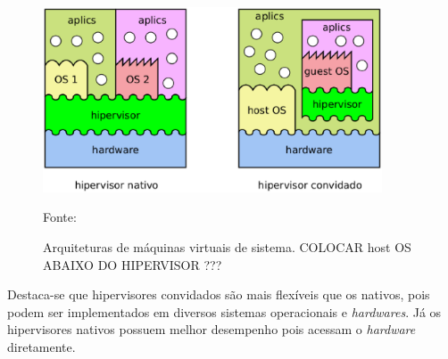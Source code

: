 \begin{figure}[vms_arquiteturas]
 \centering
 \includegraphics[width=380px]{img/vms_arquiteturas.eps}
 \caption{Arquiteturas de máquinas virtuais de sistema. COLOCAR host OS ABAIXO DO HIPERVISOR ???}
 \label{fig:vms_arquiteturas}
 Fonte: \citet{maziero2013}
\end{figure}

Destaca-se que hipervisores convidados são mais flexíveis que os nativos, pois podem ser implementados em diversos sistemas operacionais 
e \textit{hardwares}. Já os hipervisores nativos possuem melhor desempenho pois acessam o \textit{hardware} diretamente.


